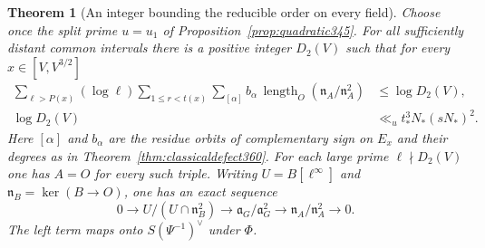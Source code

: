 \documentclass[a4paper,11pt]{article}
\newtheorem{theorem}[proposition]{Theorem}
\theoremstyle{definition}
\theoremstyle{remark}
\numberwithin{equation}{section}
\begin{document}
\begin{theorem}[An integer bounding the reducible order on every field]
\label{thm:reducibleorder379}
Choose once the split prime \(u=u_1\) of
Proposition~\ref{prop:quadratic345}. For all sufficiently
distant common intervals there is a positive integer
\(D_2(V)\) such that for every \(x\in[V,V^{3/2}]\)
\[
 \begin{split}
 \sum_{\ell>P(x)}(\log\ell)\sum_{1\le r<t(x)}
       \sum_{[\alpha]} b_\alpha\,
           \operatorname{length}_O(\mathfrak n_A/\mathfrak n_A^2)
   &\le \log D_2(V),\\
 \log D_2(V)&\ll_u t_*^3 N_* (sN_*)^2.
 \end{split}
\]
Here \([\alpha]\) and \(b_\alpha\) are the residue orbits
of complementary sign on \(E_x\) and their degrees as in
Theorem~\ref{thm:classicaldefect360}. For each large prime
\(\ell\nmid D_2(V)\) one has \(A=O\) for every such triple.
Writing \(U=B[\ell^\infty]\) and \(\mathfrak n_B=\ker(B\to O)\),
one has an exact sequence
\[
 0\longrightarrow U/(U\cap\mathfrak n_B^2)
 \longrightarrow \mathfrak a_G/\mathfrak a_G^2
 \longrightarrow \mathfrak n_A/\mathfrak n_A^2
 \longrightarrow0 .
\]
The left term maps onto \(S(\Psi^{-1})^\vee\) under \(\Phi\).
\end{theorem}
\end{document}
